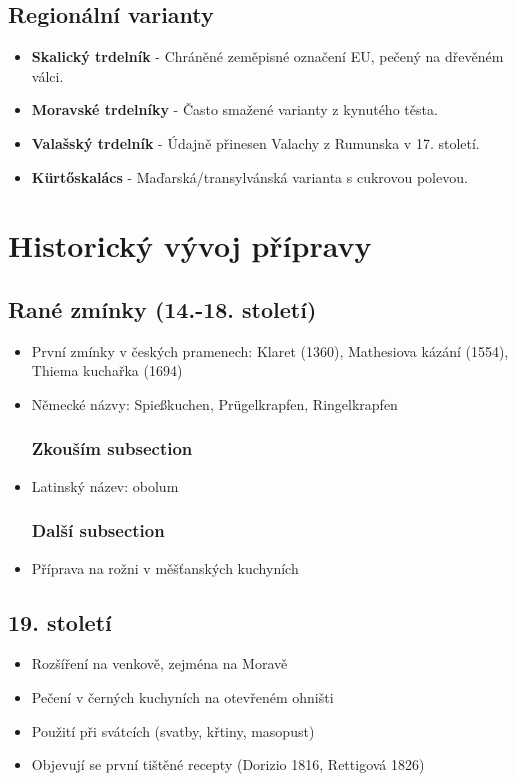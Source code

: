 \documentclass[a5paper,10pt]{book}
\begin{document}
\section{Regionální varianty}
\begin{itemize}
\item \textbf{Skalický trdelník} - Chráněné zeměpisné označení EU, pečený na dřevěném válci.
\item \textbf{Moravské trdelníky} - Často smažené varianty z kynutého těsta.
\item \textbf{Valašský trdelník} - Údajně přinesen Valachy z Rumunska v 17. století.
\item \textbf{Kürtőskalács} - Maďarská/transylvánská varianta s cukrovou polevou.
\end{itemize}

\chapter{Historický vývoj přípravy}
\section{Rané zmínky (14.-18. století)}
\begin{itemize}
\item První zmínky v českých pramenech: Klaret (1360), Mathesiova kázání (1554), Thiema kuchařka (1694)
\item Německé názvy: Spießkuchen, Prügelkrapfen, Ringelkrapfen
\subsection{Zkouším subsection}
\item Latinský název: obolum
\subsection{Další subsection}
\item Příprava na rožni v měšťanských kuchyních
\end{itemize}

\section{19. století}
\begin{itemize}
\item Rozšíření na venkově, zejména na Moravě
\item Pečení v černých kuchyních na otevřeném ohništi
\item Použití při svátcích (svatby, křtiny, masopust)
\item Objevují se první tištěné recepty (Dorizio 1816, Rettigová 1826)
\end{itemize}
\end{document}
